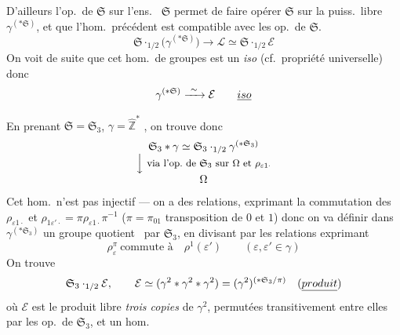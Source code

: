 \documentclass[11pt,a4paper]{article}
\begin{document}
 D'ailleurs l'op.\ de $\mathfrak{S}$ sur l'ens.\  $\mathfrak{S}$ permet de faire opérer $\mathfrak{S}$ sur la puiss.\ libre $\gamma^{(*\mathfrak{S})}$, et  que l'hom.\ précédent est compatible avec les op.\ de $\mathfrak{S}$. 
\struck{\ill{}}
\[
  \mathfrak{S} \cdot_{1/2} \bigl(\gamma^{(*\mathfrak{S})}\bigr) \longrightarrow \mathcal{L} \simeq \mathfrak{S} \cdot_{1/2} \mathcal{E}
\]
On voit de suite que cet hom.\ de groupes est un \emph{iso} (cf.\ propriété universelle) donc
\[
  \gamma^{(*\mathfrak{S})} \xrightarrow{\ \sim\ } \mathcal{E} \qquad \emph{iso}
\]

En prenant $\mathfrak{S} = \mathfrak{S}_3$, $\gamma = \widehat{\mathbb{Z}}^{*}$ , on trouve donc
\[
  \begin{array}{c}
    \mathfrak{S}_3 * \gamma \simeq \mathfrak{S}_3 \cdot_{1/2} \gamma^{(*\mathfrak{S}_3)} \\
    \Big\downarrow \ \text{\small via l'op.\ de $\mathfrak{S}_3$ sur $\Omega$ et $\rho_{\varepsilon 1\cdot}$} \\
    \Omega
  \end{array}
\]
Cet hom.\ n'est pas injectif --- on a des relations,  \struck{\ill{}} exprimant la commutation des $\rho_{\varepsilon 1 \cdot}$ et $\rho_{1\varepsilon'\cdot} = \pi \rho_{\varepsilon 1\cdot} \pi^{-1}$ ($\pi = \pi_{01}$ transposition de $0$ et $1$) donc on va définir dans $\gamma^{(*\mathfrak{S}_3)}$ un \struck{\ill{}} groupe quotient \ par $\mathfrak{S}_3$, en divisant par les relations exprimant
\[
  \rho^{\pi}_{\varepsilon} \ \text{commute à} \quad \rho^{1}(\varepsilon') \qquad (\varepsilon, \varepsilon' \in \gamma)
\]
On trouve
\[
  \mathfrak{S}_3 \cdot_{1/2} \mathcal{E}, \qquad \mathcal{E} \simeq (\gamma^2 * \gamma^2 * \gamma^2) = (\gamma^2)^{(*\mathfrak{S}_3/\pi)} \quad (\uncertain{produit})
\]
où $\mathcal{E}$ est le produit libre \emph{ trois copies} de $\gamma^2$, permutées transitivement entre elles par les op.\ de $\mathfrak{S}_3$, et un hom.
\end{document}
